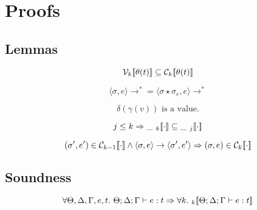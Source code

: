 \section{Proofs}

\subsection{Lemmas}

\[
    \mathcal{V}_{k} [\![ \theta(t) ]\!] \subseteq \mathcal{C}_{k} [\![ \theta(t) ]\!]
\]\label{subsetVC}

\[
    \langle \sigma, e \rangle \rightarrow^* = \langle \sigma \star \sigma_r , e \rangle \rightarrow^*
\]\label{frame}

\[
    \delta(\gamma(v))\textrm{ is a value.}
\]\label{valueSub}

\[
    j \leq k \Rightarrow \den{\_\ }{k}{\cdot} \subseteq \den{\_\ }{j}{\cdot}
\]\label{subsetKJ}

\[
    (\sigma', e') \in \mathcal{C}_{k-1} [\![ \cdot ]\!] \wedge \langle \sigma, e \rangle \rightarrow \langle \sigma', e' \rangle
    \Rightarrow (\sigma, e) \in \mathcal{C}_{k} [\![ \cdot ]\!]
\]\label{stepInC}

\subsection{Soundness}
\[
    \forall \Theta, \Delta, \Gamma, e, t.\ \Theta; \Delta ; \Gamma \vdash e : t \Rightarrow
    \forall k.\ \den{}{k}{ \Theta; \Delta ; \Gamma \vdash e : t }
\]

